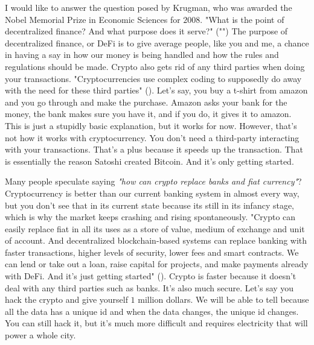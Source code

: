 \begin{essay}

  I would like to answer the question posed by Krugman, who was awarded the
  Nobel Memorial Prize in Economic Sciences for $2008$. "What is the point of
  decentralized finance? And what purpose does it serve?"
  ("\cite{krugman_opinion_nodate}") The purpose of decentralized finance, or
  DeFi is to give average people, like you and me, a chance in having a say in
  how our money is being handled and how the rules and regulations should be
  made. Crypto also gets rid of any third parties when doing your transactions.
  "Cryptocurrencies use complex coding to supposedly do away with the need for
  these third parties" (\cite{krugman_opinion_2022}). Let's say, you buy a
  t-shirt from amazon and you go through and make the purchase. Amazon asks
  your bank for the money, the bank makes sure you have it, and if you do, it
  gives it to amazon. This is just a stupidly basic explanation, but it works
  for now. However, that's not how it works with cryptocurrency. You don't need
  a third-party interacting with your transactions. That's a plus because it
  speeds up the transaction. That is essentially the reason Satoshi created
  Bitcoin. And it's only getting started.


  Many people speculate saying \textit{"how can crypto replace banks and fiat
  currency"}? Cryptocurrency is better than our current banking system in
  almost every way, but you don’t see that in its current state because its
  still in its infancy stage, which is why the market keeps crashing and rising
  spontaneously. "Crypto can easily replace fiat in all its uses as a store of
  value, medium of exchange and unit of account. And decentralized
  blockchain-based systems can replace banking with faster transactions, higher
  levels of security, lower fees and smart contracts. We can lend or take out a
  loan, raise capital for projects, and make payments already with DeFi. And
  it’s just getting started" (\cite{dwyer_will_nodate}). Crypto is faster
  because it doesn't deal with any third parties such as banks. It's also much
  secure. Let's say you hack the crypto and give yourself $1$ million dollars.
  We will be able to tell because all the data has a unique id and when the
  data changes, the unique id changes. You can still hack it, but it's much
  more difficult and requires electricity that will power a whole city.


\end{essay}
